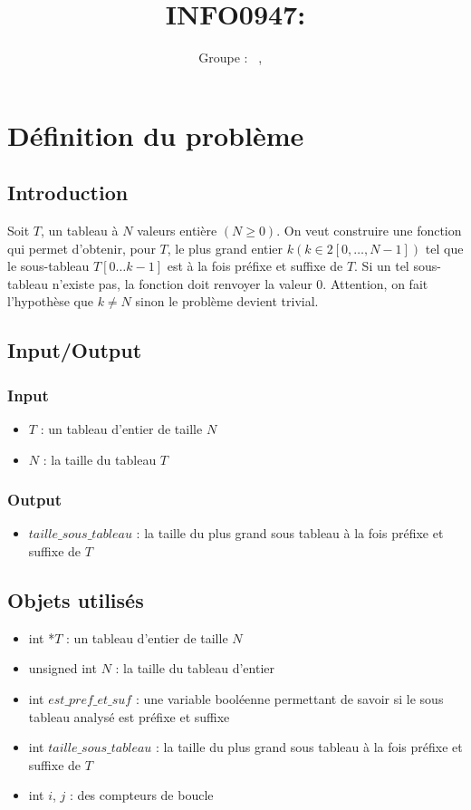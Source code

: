 \documentclass[a4paper, 11pt, oneside]{article}
\title{INFO0947: \intitule}
\author{Groupe \GrNbr : \PrenomUN~\textsc{\NomUN}, \PrenomDEUX~\textsc{\NomDEUX}}
\date{}
\newcommand{\tablemat}{~}
\renewcommand{\tablemat}{\tableofcontents}
\begin{document}
\maketitle
\newpage
\tablemat
\newpage


\section{Définition du problème}
\subsection{Introduction}
Soit $T$, un tableau à $N$ valeurs entière $(N \geq 0)$. On veut
construire une fonction qui permet d’obtenir, pour $T$, le plus 
grand entier $k (k\in2 [0,\dots,N-1])$ tel que le sous-tableau 
$T[0\dots k-1]$ est à la fois préfixe et suffixe de $T$. 
Si un tel sous-tableau n’existe pas, la fonction doit renvoyer la 
valeur 0. Attention, on fait l’hypothèse que $k\neq N$ sinon 
le problème devient trivial.
\subsection{Input/Output}
\subsubsection{Input}
\begin{itemize}
  \item $T$ : un tableau d'entier de taille $N$
  \item $N$ : la taille du tableau $T$
\end{itemize}

\subsubsection{Output}
\begin{itemize}
  \item $taille\_sous\_tableau$ : la taille du plus grand sous tableau à la fois préfixe et suffixe de $T$
\end{itemize}

\subsection{Objets utilisés}
\begin{itemize}
  \item int *$T$ : un tableau d'entier de taille $N$
  \item unsigned int $N$ : la taille du tableau d'entier
  \item int $est\_pref\_et\_suf$ : une variable booléenne permettant de savoir si le sous tableau 
  analysé est préfixe et suffixe
  \item int $taille\_sous\_tableau$ : la taille du plus grand sous tableau à la fois préfixe et suffixe de $T$
  \item int $i$, $j$ : des compteurs de boucle
\end{itemize}
\end{document}
